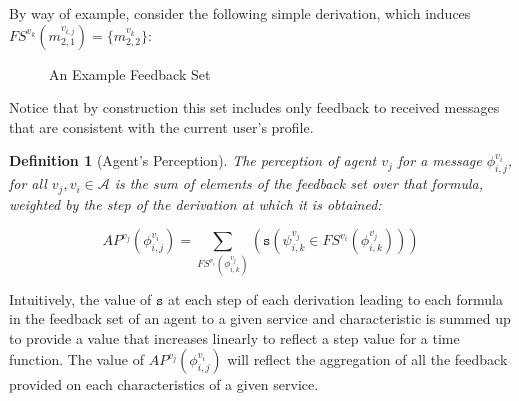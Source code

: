 \documentclass[compsoc, conference, letterpaper, 10pt, times]{IEEEtran}
\newtheorem{definition}{Definition}
\begin{document}
By way of example, consider the following simple derivation, which induces $FS^{v_{k}}(m^{v_{i,j}}_{2,1})=\{m^{v_{k}}_{2,2}\}$: 

\begin{figure*}
\begin{footnotesize}

	\begin{prooftree}
		
		\end{prooftree}
\end{footnotesize}


	\caption{An Example Feedback Set}\label{fig:ask}

\end{figure*}

Notice that by construction this set includes only feedback to received messages that are consistent with the current user's profile. 

\begin{definition}[Agent's Perception]
The perception of agent $v_{j}$ for a message $\phi^{v_{i}}_{i,j}$, for all $v_{j}, v_{i} \in \mathcal{A}$ is the sum of elements of the feedback set over that formula, weighted by the step of the derivation at which it is obtained: 

\[
AP^{v_{j}}(\phi^{v_{i}}_{i,j})=\sum_{FS^{v_{i}}(\phi^{v_{j}}_{i,k})}(\mathtt{s}(\psi^{v_{j}}_{i,k} \in FS^{v_{i}}(\phi^{v_{j}}_{i,k})))
\]

\end{definition}

Intuitively, the value of $\mathtt{s}$ at each step of each derivation leading to each formula in the feedback set of an agent to a given service and characteristic is summed up to provide a value that increases linearly to reflect a step value for a time function. The value of $AP^{v_{j}}(\phi^{v_{i}}_{i,j})$ will reflect the aggregation of all the feedback provided on each characteristics of a given service.  
\end{document}
